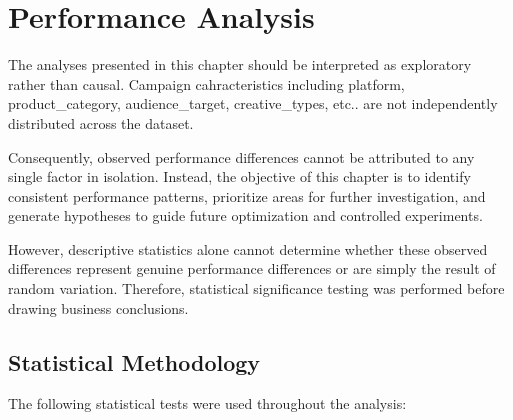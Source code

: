 \chapter{Performance Analysis}

The analyses presented in this chapter should be interpreted as exploratory rather than causal. Campaign cahracteristics including platform, product\_category, audience\_target, creative\_types, etc.. are not independently distributed across the dataset.

Consequently, observed performance differences cannot be attributed to any single factor in isolation. Instead, the objective of this chapter is to identify consistent performance patterns, prioritize areas for further investigation, and generate hypotheses to guide future optimization and controlled experiments.

However, descriptive statistics alone cannot determine whether these observed differences represent genuine performance differences or are simply the result of random variation. Therefore, statistical significance testing was performed before drawing business conclusions.

\section{Statistical Methodology}

The following statistical tests were used throughout the analysis:

